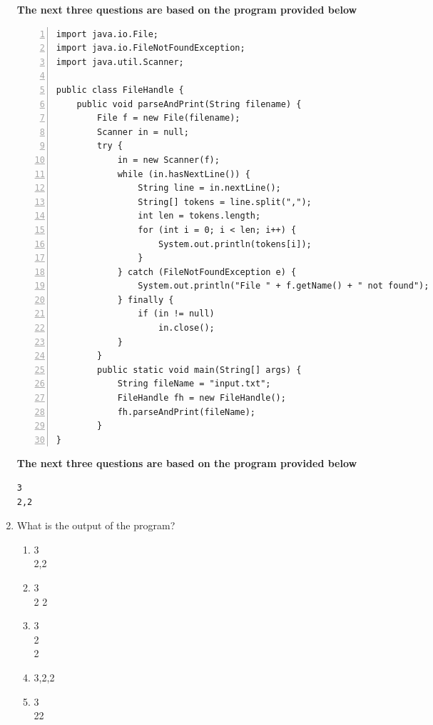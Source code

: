 \documentclass[CS180-S16-FinalExam.tex]{subfiles}
\begin{document}
\begin{enumerate}
\clearpage

\textbf{The next three questions are based on the program provided below}
\begin{lstlisting}[numbers=left]
import java.io.File;
import java.io.FileNotFoundException;
import java.util.Scanner;

public class FileHandle {
	public void parseAndPrint(String filename) {
		File f = new File(filename);
        Scanner in = null;
        try {
        	in = new Scanner(f);
			while (in.hasNextLine()) {
            	String line = in.nextLine();
                String[] tokens = line.split(",");
                int len = tokens.length;
                for (int i = 0; i < len; i++) {
                	System.out.println(tokens[i]);
                }
            } catch (FileNotFoundException e) {
            	System.out.println("File " + f.getName() + " not found");
            } finally {
            	if (in != null)
                	in.close();
            }
        }
        public static void main(String[] args) {
        	String fileName = "input.txt";
            FileHandle fh = new FileHandle();
            fh.parseAndPrint(fileName);
        }
}
\end{lstlisting}

\textbf{The next three questions are based on the program provided below}
\begin{lstlisting}
3
2,2
\end{lstlisting}
\clearpage
\item What is the output of the program?
\begin{enumerate}
\item 3\\2,2
\item  3\\2 2
\item  3\\2\\2 \ifdraft \Ans \fi 
\item 3,2,2
\item 3\\22
\end{enumerate}


\end{enumerate}
\end{document}

